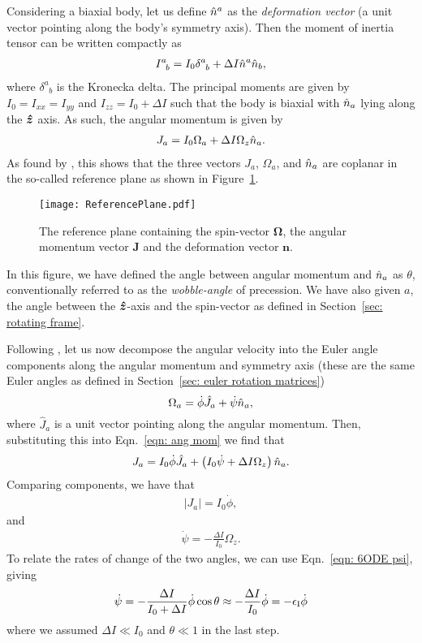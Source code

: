 \documentclass[../full_thesis/full_thesis.tex]{subfiles}
\begin{document}
Considering a biaxial body, let us define $\hat{n}^a$ as the \emph{deformation
vector} (a unit vector pointing along the body's symmetry axis). Then the
moment of inertia tensor can be written compactly as
\begin{align}
I^{a}_{\;\;b} = I_{0} \delta^{a}_{\;\;b} + \Delta I \hat{n}^a \hat{n}_b,
\end{align}
where $\delta^{a}_{\;\;b}$ is the Kronecka delta. The principal moments are
given by $I_0=I_{xx}=I_{yy}$ and
$I_{zz} = I_0 + \Delta I$ such that the body is biaxial with $\hat{n}_{a}$ lying along
the $\boldsymbol{\hat{z}}$ axis. As such, the angular momentum is given by
\begin{align}
J_{a} = I_0 \Omega_a + \Delta I \Omega_z \hat{n}_a.
\label{eqn: ang mom}
\end{align}
As found by \citet{Pines1972}, this shows that the three vectors $J_a$,
$\Omega_a$, and $\hat{n}_a$ are coplanar in the so-called reference plane as shown in
Figure~\ref{fig: reference plane}.
\begin{figure}[htb]
    \texttt{[image: ReferencePlane.pdf]}
    \caption{The reference plane containing the spin-vector $\mathbf{\Omega}$,
    the angular momentum vector $\mathbf{J}$ and the deformation vector $\mathbf{n}$.}
    \label{fig: reference plane}
\end{figure}
In this figure, we have defined the angle between angular momentum and $\hat{n}_a$ as
$\theta$, conventionally referred to as the \emph{wobble-angle} of
precession. We have also given $a$, the angle between the $\boldsymbol{\hat{z}}$-axis and the
spin-vector as defined in Section~\ref{sec: rotating frame}.

Following \citet{Jones2001}, let us now decompose the angular velocity into the
Euler angle components along the angular momentum and symmetry axis (these
are the same Euler angles as defined in Section~\ref{sec: euler rotation
matrices})
\begin{equation}
  \Omega_a = \dot{\phi}\hat{J}_a + \dot{\psi}\hat{n}_{a},
\label{eqn: decomp}
\end{equation}
where $\hat{J}_a$ is a unit vector pointing along the angular momentum. Then,
substituting this into Eqn.~\eqref{eqn: ang mom} we find that
\begin{align}
J_a = I_0 \dot{\phi} \hat{J}_a + \left(I_0 \dot{\psi} + \Delta I \Omega_z\right)\hat{n}_a.
\end{align}
Comparing components, we have that
\begin{align}
|J_a| = I_0 \dot{\phi},
\end{align}
and
\begin{align}
\dot{\psi} = -\frac{\Delta I}{I_0} \Omega_z.
\end{align}
To relate the rates of change of the two angles, we can use Eqn.~\eqref{eqn:
6ODE psi}, giving
\begin{align}
\dot{\psi} = - \frac{\Delta I}{I_0 + \Delta I} \dot{\phi} \cos\theta
\approx -\frac{\Delta I}{I_0} \dot{\phi} = -\epsilon_{\mathrm{I}} \dot{\phi}
\label{eqn: psi phi}
\end{align}
where we assumed $\Delta I \ll I_0$ and $\theta \ll 1$ in
the last step.
\end{document}
